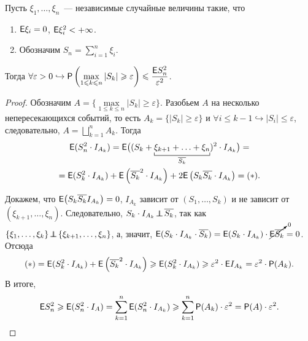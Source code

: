 \begin{theorem}
	Пусть $\xi_1,  \ldots, \xi_n$~--- независимые случайные величины такие, что
	\begin{enumerate}
	    \item $\mathsf{E} \xi_i = 0$, $\mathsf{E} \xi_i^2 < +\infty$.
	    \item Обозначим $S_n = \sum\limits_{i = 1}^n \xi_i$.
	\end{enumerate}  
	
	Тогда $\forall \varepsilon > 0 \hookrightarrow \mathsf{P} \left( \max\limits_{1 \leqslant k \leqslant n} |S_k| \geqslant \varepsilon \right) \leqslant \dfrac{\mathsf{E} S_n^2}{\varepsilon^2}$.
	\begin{proof}
		Обозначим $A = \{ \max\limits_{1 \leqslant k \leqslant n} |S_k| \geqslant \varepsilon \}$. Разобьем $A$ на несколько непересекающихся событий, то есть $A_k = \big\{ |S_k| \geqslant \varepsilon\big\}$ и $\forall i \leqslant k - 1 \hookrightarrow |S_i| \leqslant \varepsilon$, следовательно, $A = \bigsqcup\limits_{k=1}^{n} A_k$. Тогда
		\begin{multline*}
			\E(S_n^2 \cdot I_{A_k}) = \E\big( (S_k + \underbracket[0.5pt]{\xi_{k+1} + \ldots + \xi_n}_{\overline{S_k}} )^2 \cdot I_{A_k} \big) =  \\= \E( S_k^2 \cdot I_{A_k} ) + \E\left( \overline{S_k}^2 \cdot I_{A_k} \right) + 2 \E\left( S_k \overline{S_k} \cdot I_{A_k} \right) = (*).
		\end{multline*}
		
		Докажем, что $\mathsf{E} \big(S_k\overline{S_k}I_{A_k} \big) = 0$, $I_{A_k}$ зависит от $(S_1, \dots, S_k)$ и не зависит от $(\xi_{k+1}, \dots, \xi_n)$.
		Следовательно, $S_k \cdot I_{A_k} \!\perp\!\!\!\!\perp\! \overline{S_k}$, так как $\{\xi_1, \ldots, \xi_k \} \!\perp\!\!\!\!\perp\! \{ \xi_{k+1}, \ldots,\xi_n \}$, а, значит, $\mathsf{E}( S_k \cdot I_{A_k} \cdot \overline{S_k} ) = \mathsf{E}(S_k \cdot I_{A_k}) \cdot \cancelto{0}{\mathsf{E} \overline{S_k}} = 0$. Отсюда
		\begin{equation*}
			(*) = \mathsf{E}( S_k^2 \cdot I_{A_k} ) + \mathsf{E} \left( \overline{S_k}^2 \cdot I_{A_k}  \right) \geqslant \mathsf{E}(S_k^2 \cdot I_{A_k} ) \geqslant \varepsilon^2 \cdot \mathsf{E} I_{A_k} = \varepsilon^2 \cdot \mathsf{P}(A_k).
		\end{equation*}
		В итоге, 
		\begin{equation*}
			\mathsf{E} S_n^2 \geqslant \mathsf{E}( S_n^2 \cdot I_A ) = \sum\limits_{k = 1}^n \mathsf{E}( S_n^2 \cdot I_{A_k} ) \geqslant \sum\limits_{k = 1}^n \mathsf{P}(A_k) \cdot \varepsilon^2 = \mathsf{P}(A) \cdot \varepsilon^2.
		\end{equation*}
	\end{proof}
\end{theorem}
